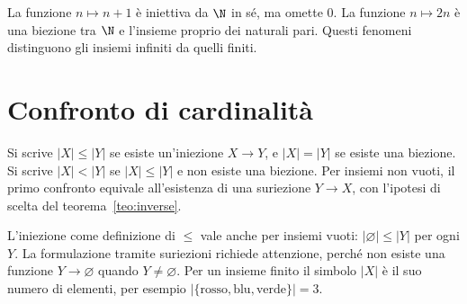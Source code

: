 \begin{esempio}
La funzione $n\mapsto n+1$ è iniettiva da $\N$ in sé, ma omette $0$. La funzione $n\mapsto2n$ è una biezione tra $\N$ e l'insieme proprio dei naturali pari. Questi fenomeni distinguono gli insiemi infiniti da quelli finiti.
\end{esempio}

\begin{schema}
\end{schema}

\section{Confronto di cardinalità}
\begin{definizione}
Si scrive $|X|\le|Y|$ se esiste un'iniezione $X\to Y$, e $|X|=|Y|$ se esiste una biezione. Si scrive $|X|<|Y|$ se $|X|\le|Y|$ e non esiste una biezione. Per insiemi non vuoti, il primo confronto equivale all'esistenza di una suriezione $Y\to X$, con l'ipotesi di scelta del teorema~\ref{teo:inverse}.
\end{definizione}

\begin{osservazione}
L'iniezione come definizione di $\le$ vale anche per insiemi vuoti: $|\varnothing|\le|Y|$ per ogni $Y$. La formulazione tramite suriezioni richiede attenzione, perché non esiste una funzione $Y\to\varnothing$ quando $Y\ne\varnothing$. Per un insieme finito il simbolo $|X|$ è il suo numero di elementi, per esempio $|\{\text{rosso},\text{blu},\text{verde}\}|=3$.
\end{osservazione}

